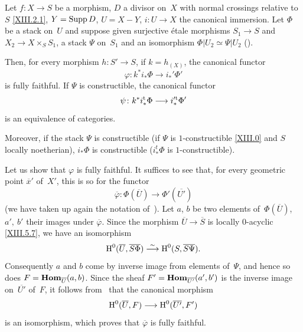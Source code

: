 \begin{corollary}
\label{XIII.2.5}
Let
$f\colon X\to S$ be a morphism, $D$ a divisor on~$X$
with normal crossings relative to~$S$ \eqref{XIII.2.1},
$Y=\operatorname{Supp} D$, $U=X- Y$, $i\colon U\to X$ the canonical
immersion. Let $\Phi$ be a stack on~$U$ and suppose given
surjective \'etale morphisms $S_1\to S$ and $X_2\to
X\times_{S}S_1$, a stack $\Psi$ on~$S_1$ and an isomorphism
$\Phi|U_2\simeq\Psi|U_2$ (\cf {}).

Then, for every morphism $h\colon S'\to S$, if $k=h_{(X)}$,
the canonical functor
$$
\varphi\colon k^*i_*\Phi\to i_*'\Phi'
$$
is fully faithful. If $\Psi$ is constructible, the canonical
functor
$$
\psi\colon k^*i_*^{\tame}\Phi\to i_*^{\prime\tame}\Phi'
$$
is an equivalence of categories.

Moreover, if the stack $\Psi$ is constructible (\resp if $\Psi$ is
$1$-constructible \eqref{XIII.0} and $S$ locally noetherian),
$i_*\Phi$ is constructible (\resp $i_*^t\Phi$ is
$1$-constructible).
\end{corollary}

Let us show that $\varphi$ is fully faithful. It suffices to see
that, for every geometric point $\overline{x}'$ of~$X'$, this
is so for the functor
$$
\overline{\varphi}\colon
\Phi(\overline{U})\to\Phi'(\overline{U'})
$$
(we have taken up again the notation of~). Let $a$, $b$ be two
elements of~$\Phi(\overline{U})$, $a',\ b'$ their images under
$\overline{\varphi}$. Since the morphism
$\overline{U}\to\overline{S}$ is locally $0$-acyclic
\eqref{XIII.5.7}, we have an isomorphism
$$
\H^0(\overline{U},\overline{S\Phi})
\overset{\sim}{\to}\H^0(S,\overline{S\Psi}).
$$
Consequently $a$ and $b$ come by inverse image from elements
of~$\Psi$, and hence so does
$F=\operatorname{\mathbf{Hom}}_{\overline{U}}(a,b)$. Since the sheaf
$F'=\operatorname{\mathbf{Hom}}_{\overline{U'}}(a',b')$ is the inverse image on~$\overline{U'}$ of~$F$, it follows from~ that the
canonical morphism
$$
\H^0(\overline{U},F)\to \H^0(\overline{U'},F')
$$
is an isomorphism, which proves that $\overline{\varphi}$ is
fully faithful.


